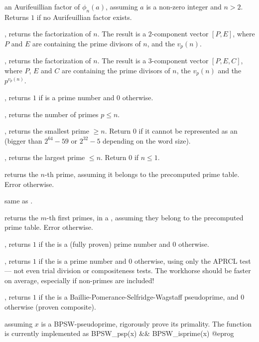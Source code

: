  an Aurifeuillian factor of
$\phi_n(a)$, assuming $a$ is a non-zero integer and $n > 2$. Returns $1$
if no Aurifeuillian factor exists.

, returns the factorization of $n$. The result
is a $2$-component vector $[P,E]$, where $P$ and $E$ are 
containing the prime divisors of $n$, and the $v_p(n)$.


, returns the factorization of $n$. The result
is a $3$-component vector $[P,E,C]$, where $P$, $E$ and $C$ are
 containing the prime divisors of $n$, the $v_p(n)$
and the $p^{v_p(n)}$.


, returns $1$ if  is a prime number and
$0$ otherwise.

, returns the number of primes $p\leq n$.

, returns the smallest prime $\geq n$. Return
$0$ if it cannot be represented as an  (bigger than $2^{64} - 59$
or $2^{32} - 5$ depending on the word size).

, returns the largest prime $\leq n$. Return
$0$ if $n\leq 1$.

 returns the $n$-th prime, assuming it belongs to
the precomputed prime table. Error otherwise.

 same as .

 returns the $m$-th first primes, in a
, assuming they belong to the precomputed prime table.
Error otherwise.

, returns $1$ if the   is a
(fully proven) prime number and $0$ otherwise.

, returns $1$ if the   is a
prime number and $0$ otherwise, using only the APRCL test --- not even trial
division or compositeness tests. The workhorse  should be
faster on average, especially if non-primes are included!

, returns $1$ if the   is a
Baillie-Pomerance-Selfridge-Wagstaff pseudoprime, and $0$ otherwise (proven
composite).

 assuming $x$ is a BPSW-pseudoprime, rigorously
prove its primality. The function  is currently implemented
as
\bprog
 BPSW_psp(x) && BPSW_isprime(x)
@eprog

